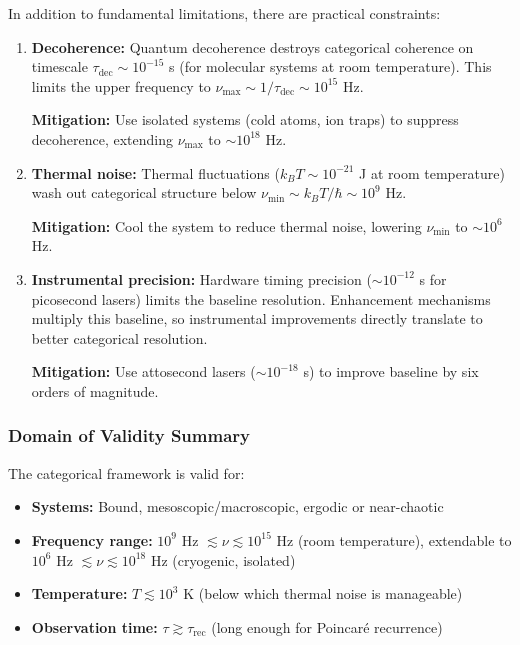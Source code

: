 \documentclass[twocolumn,10pt]{article}
\theoremstyle{remark}
\begin{document}
In addition to fundamental limitations, there are practical constraints:

\begin{enumerate}
    \item \textbf{Decoherence:} Quantum decoherence destroys categorical coherence on timescale $\tau_{\text{dec}} \sim 10^{-15}$ s (for molecular systems at room temperature). This limits the upper frequency to $\nu_{\max} \sim 1/\tau_{\text{dec}} \sim 10^{15}$ Hz.

    \textbf{Mitigation:} Use isolated systems (cold atoms, ion traps) to suppress decoherence, extending $\nu_{\max}$ to $\sim 10^{18}$ Hz.

    \item \textbf{Thermal noise:} Thermal fluctuations ($k_B T \sim 10^{-21}$ J at room temperature) wash out categorical structure below $\nu_{\min} \sim k_B T/\hbar \sim 10^{9}$ Hz.

    \textbf{Mitigation:} Cool the system to reduce thermal noise, lowering $\nu_{\min}$ to $\sim 10^{6}$ Hz.

    \item \textbf{Instrumental precision:} Hardware timing precision ($\sim 10^{-12}$ s for picosecond lasers) limits the baseline resolution. Enhancement mechanisms multiply this baseline, so instrumental improvements directly translate to better categorical resolution.

    \textbf{Mitigation:} Use attosecond lasers ($\sim 10^{-18}$ s) to improve baseline by six orders of magnitude.
\end{enumerate}

\subsubsection{Domain of Validity Summary}

The categorical framework is valid for:
\begin{itemize}
    \item \textbf{Systems:} Bound, mesoscopic/macroscopic, ergodic or near-chaotic
    \item \textbf{Frequency range:} $10^{9}$ Hz $\lesssim \nu \lesssim 10^{15}$ Hz (room temperature), extendable to $10^{6}$ Hz $\lesssim \nu \lesssim 10^{18}$ Hz (cryogenic, isolated)
    \item \textbf{Temperature:} $T \lesssim 10^3$ K (below which thermal noise is manageable)
    \item \textbf{Observation time:} $\tau \gtrsim \tau_{\text{rec}}$ (long enough for Poincaré recurrence)
\end{itemize}
\end{document}
